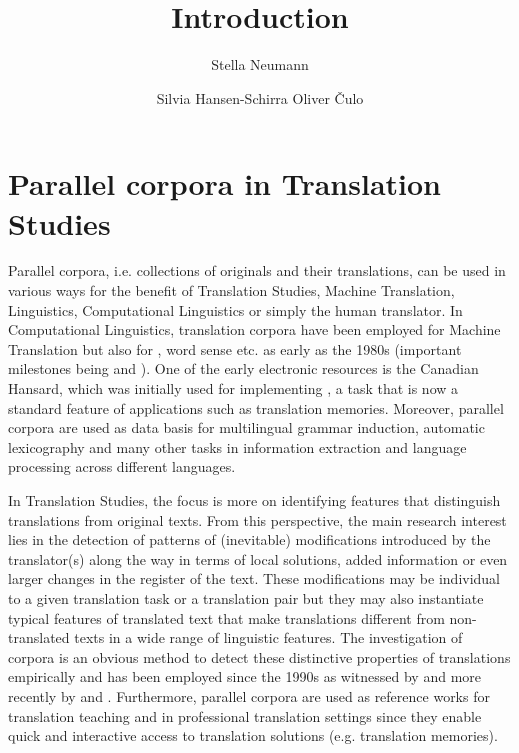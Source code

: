 \documentclass[output=paper]{LSP/langsci}
\author{Stella Neumann\affiliation{IFAAR, RWTH Aachen}\and
 Silvia Hansen-Schirra\lastand 
Oliver Čulo\affiliation{Johannes Gutenberg-Universität Mainz in Germersheim}
}
\title{Introduction}
\begin{document}
\section{Parallel corpora in Translation Studies}

Parallel corpora, i.e. collections of originals and their translations, can be used in various ways for the benefit of Translation Studies, Machine Translation, Linguistics, Computational Linguistics or simply the human translator. 
In Computational Linguistics, translation corpora have been employed for Machine Translation but also for , word sense  etc. as early as the 1980s (important milestones being  \citealt{Nagao1984} and \citealt{Brown1990}). One of the early electronic resources is the Canadian Hansard, which was initially used for implementing  \citep{Gale1991}, a task that is now a standard feature of applications such as translation memories. Moreover, parallel corpora are used as data basis for multilingual grammar induction, automatic lexicography and many other tasks in information extraction and language processing across different languages.

In Translation Studies, the focus is more on identifying features that distinguish translations from original texts. From this perspective, the main research interest lies in the detection of patterns of (inevitable) modifications introduced by the translator(s) along the way in terms of local solutions, added information or even larger changes in the register of the text. These modifications may be individual to a given translation task or a translation pair but they may also instantiate typical features of translated text that make translations different from non-translated texts in a wide range of linguistic features. The investigation of corpora is an obvious method to detect these distinctive properties of translations empirically and has been employed since the 1990s as witnessed by \citet{Baker1993,Baker1996,Johansson1996} and more recently by  \citet{Hansen2003,Teich2003,Mauranen2004} and \citet{Hansen-Schirra2012}. Furthermore, parallel corpora are used as reference works for translation teaching and in professional translation settings since they enable quick and interactive access to translation solutions (e.g. translation memories).
 
\end{document}
